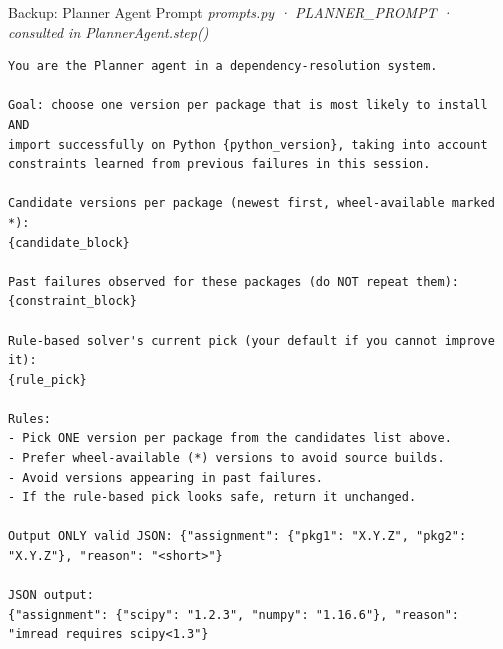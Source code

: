 \documentclass[aspectratio=169,10pt]{beamer}
\begin{document}
\begin{frame}[fragile]{Backup: Planner Agent Prompt}
\vspace{0.1em}
{\tiny\color{gray}\textit{prompts.py · PLANNER\_PROMPT · consulted in PlannerAgent.step()}}
\vspace{0.2em}
\begin{lstlisting}[basicstyle=\tiny\ttfamily, breaklines=true, breakatwhitespace=true, language={}, stringstyle={}, commentstyle={}, keywordstyle={}, emph={python_version,candidate_block,constraint_block,rule_pick,assignment_block,regex_type,regex_sig,error_log,pattern,total_failures,last_error_types,python_versions_tried}, emphstyle={\color{mLightBrown}}]
You are the Planner agent in a dependency-resolution system.

Goal: choose one version per package that is most likely to install AND
import successfully on Python {python_version}, taking into account
constraints learned from previous failures in this session.

Candidate versions per package (newest first, wheel-available marked *):
{candidate_block}

Past failures observed for these packages (do NOT repeat them):
{constraint_block}

Rule-based solver's current pick (your default if you cannot improve it):
{rule_pick}

Rules:
- Pick ONE version per package from the candidates list above.
- Prefer wheel-available (*) versions to avoid source builds.
- Avoid versions appearing in past failures.
- If the rule-based pick looks safe, return it unchanged.

Output ONLY valid JSON: {"assignment": {"pkg1": "X.Y.Z", "pkg2": "X.Y.Z"}, "reason": "<short>"}

JSON output:
{"assignment": {"scipy": "1.2.3", "numpy": "1.16.6"}, "reason": "imread requires scipy<1.3"}
\end{lstlisting}
\end{frame}
\end{document}
